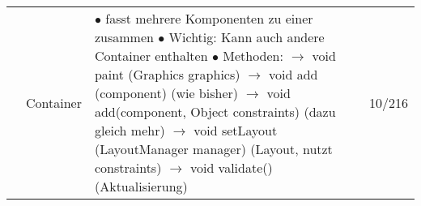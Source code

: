 \documentclass[11pt,a4paper]{article}
\begin{document}
\begin{center}
\begin{longtable}[h]{ | p{2.3cm} | p{2.3cm} | p{12.6cm} | p{1.2cm} | }
 	& Container & \makecell[l]{$\bullet$ fasst mehrere Komponenten zu einer zusammen \\
 	$\bullet$ Wichtig: Kann auch andere Container enthalten \\ 
    $\bullet$ Methoden: \\
 	\hspace{0.4cm} $\rightarrow$ void paint (Graphics graphics)\\
 	\hspace{0.4cm} $\rightarrow$ void add (component) (wie bisher) \\
 	\hspace{0.4cm} $\rightarrow$ void add(component, Object constraints) (dazu gleich mehr) \\
 	\hspace{0.4cm} $\rightarrow$ void setLayout (LayoutManager manager) (Layout, nutzt constraints) \\
 	\hspace{0.4cm} $\rightarrow$ void validate() (Aktualisierung)}  & 10/216 \\ \cline{2-4}
	

\end{longtable}
\end{center}
\end{document}
